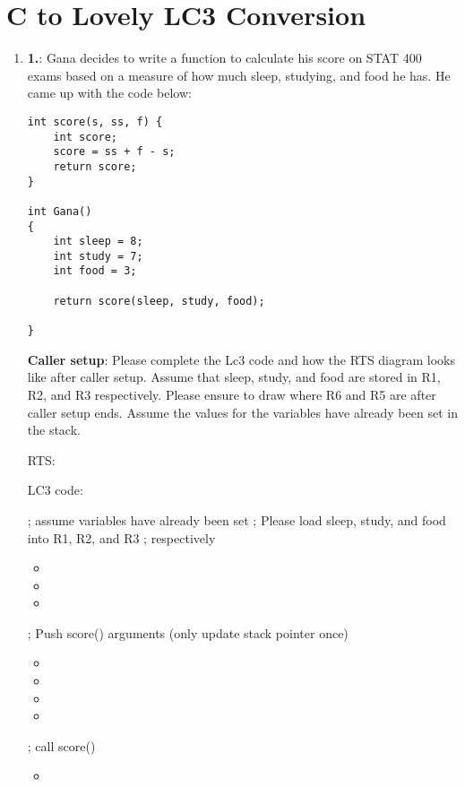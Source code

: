 \documentclass{article}
\begin{document}
\section{C to Lovely LC3 Conversion}
\begin{enumerate}[label=(\alph*), itemsep = 120pt]
    \item \textbf{1.}: Gana decides to write a function to calculate his score on STAT 400 exams based on a measure of how much sleep, studying, and food he has. He came up with the code below:

        \begin{lstlisting}[style=CStyle]
int score(s, ss, f) {
    int score;
    score = ss + f - s;
    return score;
}

int Gana()
{
    int sleep = 8;
    int study = 7;
    int food = 3;

    return score(sleep, study, food);
    
} \end{lstlisting}
\textbf{Caller setup}: Please complete the Lc3 code and how the RTS diagram looks like after caller setup. Assume that sleep, study, and food are stored in R1, R2, and R3 respectively. Please ensure to draw where R6 and R5 are after caller setup ends. Assume the values for the variables have already been set in the stack.

RTS:
\newline
\newline
\newline
\newline
\newline
\newline
\newline
\newline
\newline
\newline
\newline


LC3 code: 

; assume variables have already been set
; Please load sleep, study, and food into R1, R2, and R3 
 ; respectively 

\begin{itemize}
    \item 
    \item 
    \item
\end{itemize}
; Push score() arguments (only update stack pointer once)
\begin{itemize}
    \item 
    \item 
    \item
    \item
\end{itemize}
; call score()
\begin{itemize}
    \item 
\end{itemize}
 \newline
  \newline
   \newline
    \newline


\end{enumerate}
\end{document}
